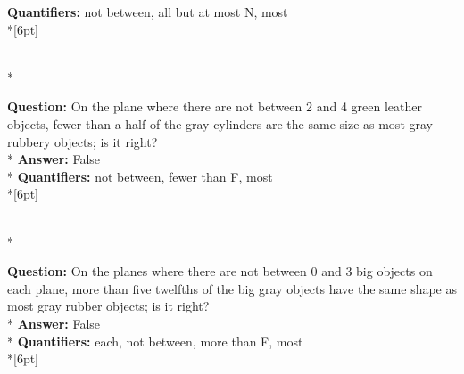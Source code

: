 \begin{figure*}
\begin{minipage}{0.48\textwidth}
\begin{minipage}[t][2.2cm][t]{1\textwidth}
      \textbf{Quantifiers:} not between, all but at most N, most \\*[6pt]
    \end{minipage}\\*
    \begin{minipage}[t][2.2cm][t]{1\textwidth}
      \footnotesize
      \textbf{Question:} On the plane where there are not between 2 and 4 green leather objects, fewer than a half of the gray cylinders are the same size as most gray rubbery objects; is it right? \\*
      \textbf{Answer:} False \\*
      \textbf{Quantifiers:} not between, fewer than F, most \\*[6pt]
    \end{minipage}\\*
    \begin{minipage}[t][2.2cm][t]{1\textwidth}
      \footnotesize
      \textbf{Question:} On the planes where there are not between 0 and 3 big objects on each plane, more than five twelfths of the big gray objects have the same shape as most gray rubber objects; is it right? \\*
      \textbf{Answer:} False \\*
      \textbf{Quantifiers:} each, not between, more than F, most \\*[6pt]
    \end{minipage}
  \end{minipage}
\end{figure*}




